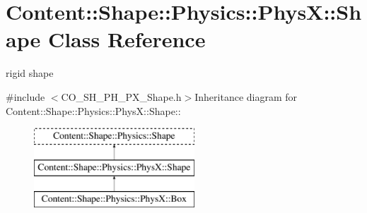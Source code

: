 \hypertarget{classContent_1_1Shape_1_1Physics_1_1PhysX_1_1Shape}{
\section{Content::Shape::Physics::PhysX::Shape Class Reference}
\label{classContent_1_1Shape_1_1Physics_1_1PhysX_1_1Shape}
}


rigid shape  


{\ttfamily \#include $<$CO\_\-SH\_\-PH\_\-PX\_\-Shape.h$>$}Inheritance diagram for Content::Shape::Physics::PhysX::Shape::\begin{figure}[H]
\begin{center}
\leavevmode
\includegraphics[height=3cm]{classContent_1_1Shape_1_1Physics_1_1PhysX_1_1Shape}
\end{center}
\end{figure}
